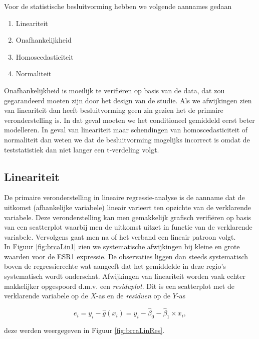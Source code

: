 \documentclass[
  12pt,dutch,coursenotes]{book}
\providecommand{\tightlist}{%
  \setlength{\itemsep}{0pt}\setlength{\parskip}{0pt}}
\theoremstyle{definition}
\theoremstyle{definition}
\theoremstyle{definition}
\theoremstyle{definition}
\theoremstyle{remark}
\begin{document}
Voor de statistische besluitvorming hebben we volgende aannames gedaan

\begin{enumerate}
\def\labelenumi{\arabic{enumi}.}
\tightlist
\item
  Lineariteit
\item
  Onafhankelijkheid\\
\item
  Homoscedasticiteit
\item
  Normaliteit
\end{enumerate}

Onafhankelijkheid is moeilijk te verifiëren op basis van de data, dat zou gegarandeerd moeten zijn door het design van de studie.
Als we afwijkingen zien van lineariteit dan heeft besluitvorming geen zin gezien het de primaire veronderstelling is.
In dat geval moeten we het conditioneel gemiddeld eerst beter modelleren.
In geval van lineariteit maar schendingen van homoscedasticiteit of normaliteit dan weten we dat de besluitvorming mogelijks incorrect is omdat de teststatistiek dan niet langer een t-verdeling volgt.

\hypertarget{lineariteit}{%
\subsection{Lineariteit}\label{lineariteit}}

De primaire veronderstelling in lineaire regressie-analyse is de aanname dat de uitkomst (afhankelijke variabele) lineair varieert ten opzichte van de verklarende variabele. Deze veronderstelling kan men gemakkelijk grafisch verifiëren op basis van een scatterplot waarbij men de uitkomst uitzet in functie van de verklarende variabele. Vervolgens gaat men na of het verband een lineair patroon volgt.\\
In Figuur \ref{fig:brcaLin1} zien we systematische afwijkingen bij kleine en grote waarden voor de ESR1 expressie.
De observaties liggen dan steeds systematisch boven de regressierechte wat aangeeft dat het gemiddelde in deze regio's systematisch wordt onderschat.
Afwijkingen van lineariteit worden vaak echter makkelijker opgespoord d.m.v. een \emph{residuplot}. Dit is een scatterplot met de
verklarende variabele op de \(X\)-as en de \emph{residuen} op de \(Y\)-as

\[e_i=y_i-\hat{g}(x_i)=y_i-\hat\beta_0-\hat\beta_1\times x_i,\]

deze werden weergegeven in Figuur \ref{fig:brcaLinRes}.
\end{document}
